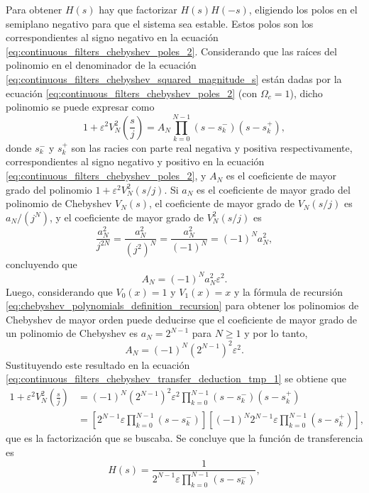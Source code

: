 \documentclass[a4paper]{report}
\begin{document}
Para obtener \(H(s)\) hay que factorizar \(H(s)H(-s)\), eligiendo los polos en el semiplano negativo para que el sistema sea estable. Estos polos son los correspondientes al signo negativo en la ecuación \ref{eq:continuous_filters_chebyshev_poles_2}. Considerando que las raíces del polinomio en el denominador de la ecuación \ref{eq:continuous_filters_chebyshev_squared_magnitude_s} están dadas por la ecuación \ref{eq:continuous_filters_chebyshev_poles_2} (con \(\Omega_c=1\)), dicho polinomio se puede expresar como
\begin{equation}\label{eq:continuous_filters_chebyshev_transfer_deduction_tmp_1}
 1+\varepsilon^2V^2_N\left(\frac{s}{j}\right)=A_N\prod_{k=0}^{N-1}(s- s_k^-)(s-s_k^+),  
\end{equation}
donde \(s_k^-\) y \(s_k^+\) son las racies con parte real negativa y positiva respectivamente, correspondientes al signo negativo y positivo en la ecuación \ref{eq:continuous_filters_chebyshev_poles_2}, y \(A_N\) es el coeficiente de mayor grado del polinomio \(1+\varepsilon^2V^2_N(s/j)\). Si \(a_N\) es el coeficiente de mayor grado del polinomio de Chebyshev \(V_N(s)\), el coeficiente de mayor grado de \(V_N(s/j)\) es \(a_N/(j^{N})\), y el coeficiente de mayor grado de \(V_N^2(s/j)\) es 
\[
 \dfrac{a_N^2}{j^{2N}}=\dfrac{a_N^2}{(j^2)^N}=\dfrac{a_N^2}{(-1)^N}=(-1)^Na_N^2,
\]
concluyendo que 
\[
 A_N=(-1)^Na_N^2\varepsilon^2.
\]
Luego, considerando que \(V_0(x)=1\) y \(V_1(x)=x\) y la fórmula de recursión \ref{eq:chebyshev_polynomials_definition_recursion} para obtener los polinomios de Chebyshev de mayor orden puede deducirse que el coeficiente de mayor grado de un polinomio de Chebyshev es \(a_N=2^{N-1}\) para \(N\geq1\) y por lo tanto,
\[
 A_N=(-1)^N\left(2^{N-1}\right)^2\varepsilon^2.
\]
Sustituyendo este resultado en la ecuación \ref{eq:continuous_filters_chebyshev_transfer_deduction_tmp_1} se obtiene que 
\begin{align}
 1+\varepsilon^2V^2_N\left(\frac{s}{j}\right)&=(-1)^N\left(2^{N-1}\right)^2\varepsilon^2\prod_{k=0}^{N-1}(s- s_k^-)(s-s_k^+)\nonumber\\
  &=\left[2^{N-1}\varepsilon \prod_{k=0}^{N-1}(s- s_k^-)\right]\left[(-1)^N2^{N-1}\varepsilon\prod_{k=0}^{N-1}(s-s_k^+)\right],\label{eq:continuous_filters_chebyshev_transfer_deduction_tmp_2}
\end{align}
que es la factorización que se buscaba. Se concluye que la función de transferencia es
\begin{equation}\label{eq:continuous_filters_chebyshev_transfer_function}
 H(s)=\frac{1}{\displaystyle 2^{N-1}\varepsilon\prod_{k=0}^{N-1}(s- s_k^-)}, 
\end{equation}
\end{document}
